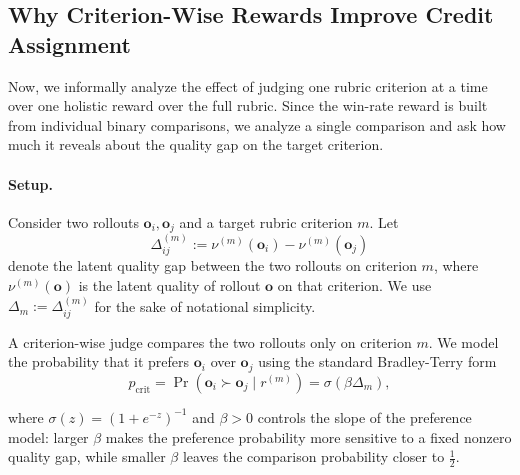 \documentclass{article}
\theoremstyle{plain}
\theoremstyle{definition}
\theoremstyle{remark}
\begin{document}
\subsection{Why Criterion-Wise Rewards Improve Credit Assignment}
\label{app:pairwise-theory}

Now, we informally analyze the effect of judging one rubric criterion at a time over one holistic reward over the full rubric. Since the win-rate reward is built from individual binary comparisons, we analyze a single comparison and ask how much it reveals about the quality gap on the target criterion.
\paragraph{Setup.}
Consider two rollouts $\mathbf{o}_i,\mathbf{o}_j$ and a target rubric criterion $m$.
Let
\[
\Delta^{(m)}_{ij}
:=
\nu^{(m)}(\mathbf{o}_i)-\nu^{(m)}(\mathbf{o}_j)
\]
denote the latent quality gap between the two rollouts on criterion $m$, where
$\nu^{(m)}(\mathbf{o})$ is the latent quality of rollout $\mathbf{o}$ on that criterion.
We use $\Delta_m := \Delta^{(m)}_{ij}$ for the sake of notational simplicity.

A criterion-wise judge compares the two rollouts only on criterion $m$. We model the
probability that it prefers $\mathbf{o}_i$ over $\mathbf{o}_j$ using the standard
Bradley-Terry form
\[
p_{\mathrm{crit}}
=
\Pr(\mathbf{o}_i \succ \mathbf{o}_j \mid r^{(m)})
=
\sigma(\beta \Delta_m),
\]






where $\sigma(z)=(1+e^{-z})^{-1}$ and $\beta>0$ controls the slope of the preference model: larger $\beta$ makes the preference probability more sensitive to a fixed nonzero quality gap, while smaller $\beta$ leaves the comparison probability closer to $\tfrac12$.
\end{document}
